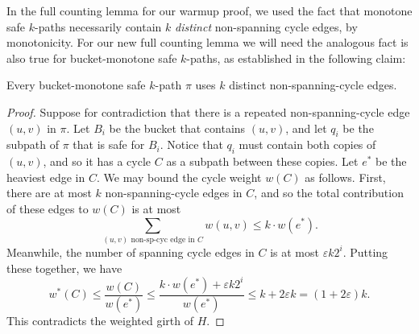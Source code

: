 \documentclass{article}\usepackage[a4paper,margin=20mm]{geometry}
\newcommand{\eps}{\varepsilon}
\begin{document}
In the full counting lemma for our warmup proof, we used the fact that monotone safe $k$-paths necessarily contain $k$ \emph{distinct} non-spanning cycle edges, by monotonicity.
For our new full counting lemma we will need the analogous fact is also true for bucket-monotone safe $k$-paths, as established in the following claim:
\begin{claim} \label{clm:bmsdistinct}
Every bucket-monotone safe $k$-path $\pi$ uses $k$ distinct non-spanning-cycle edges.
\end{claim}
\begin{proof}
Suppose for contradiction that there is a repeated non-spanning-cycle edge $(u, v)$ in $\pi$.
Let $B_i$ be the bucket that contains $(u, v)$, and let $q_i$ be the subpath of $\pi$ that is safe for $B_i$.
Notice that $q_i$ must contain both copies of $(u, v)$, and so it has a cycle $C$ as a subpath between these copies.
Let $e^*$ be the heaviest edge in $C$.
We may bound the cycle weight $w(C)$ as follows.
First, there are at most $k$ non-spanning-cycle edges in $C$, and so the total contribution of these edges to $w(C)$ is at most
$$\sum \limits_{(u, v) \text{ non-sp-cyc edge in } C} w(u, v) \le k \cdot w(e^*).$$
Meanwhile, the number of spanning cycle edges in $C$ is at most $\eps k 2^i$.
Putting these together, we have
$$w^*(C) \le \frac{w(C)}{w(e^*)} \le \frac{k \cdot w(e^*) + \eps k 2^i}{w(e^*)} \le k + 2 \eps k = (1 + 2\eps) k.$$
This contradicts the weighted girth of $H$.
\end{proof}
\end{document}
